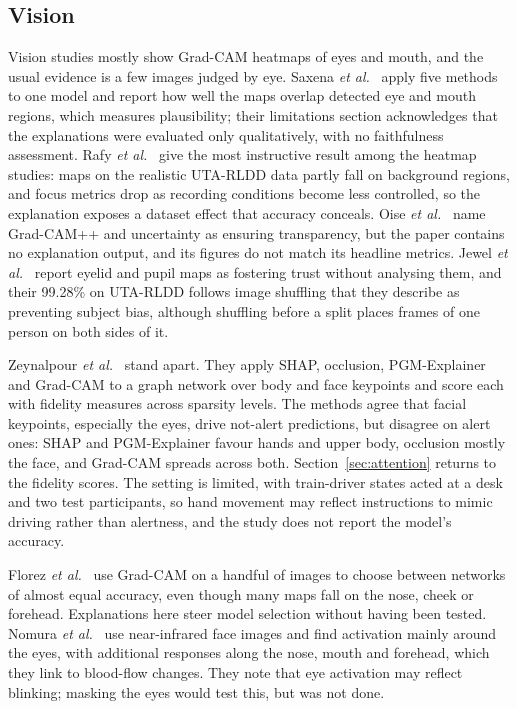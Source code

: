 \subsection{Vision}
\label{sec:vision}
Vision studies mostly show Grad-CAM heatmaps of eyes and mouth, and the usual evidence is a few images judged by eye. Saxena \textit{et al.}~\cite{saxena2026lowlight} apply five methods to one model and report how well the maps overlap detected eye and mouth regions, which measures plausibility; their limitations section acknowledges that the explanations were evaluated only qualitatively, with no faithfulness assessment. Rafy \textit{et al.}~\cite{rafy2026domain} give the most instructive result among the heatmap studies: maps on the realistic UTA-RLDD data partly fall on background regions, and focus metrics drop as recording conditions become less controlled, so the explanation exposes a dataset effect that accuracy conceals. Oise \textit{et al.}~\cite{oise2026enhancing} name Grad-CAM++ and uncertainty as ensuring transparency, but the paper contains no explanation output, and its figures do not match its headline metrics. Jewel \textit{et al.}~\cite{jewel2025lightweight} report eyelid and pupil maps as fostering trust without analysing them, and their 99.28\% on UTA-RLDD follows image shuffling that they describe as preventing subject bias, although shuffling before a split places frames of one person on both sides of it.

Zeynalpour \textit{et al.}~\cite{zeynalpour2025multimethod} stand apart. They apply SHAP, occlusion, PGM-Explainer and Grad-CAM to a graph network over body and face keypoints and score each with fidelity measures across sparsity levels. The methods agree that facial keypoints, especially the eyes, drive not-alert predictions, but disagree on alert ones: SHAP and PGM-Explainer favour hands and upper body, occlusion mostly the face, and Grad-CAM spreads across both. Section~\ref{sec:attention} returns to the fidelity scores. The setting is limited, with train-driver states acted at a desk and two test participants, so hand movement may reflect instructions to mimic driving rather than alertness, and the study does not report the model's accuracy.

Florez \textit{et al.}~\cite{florez2023cnn,florez2024realtime} use Grad-CAM on a handful of images to choose between networks of almost equal accuracy, even though many maps fall on the nose, cheek or forehead. Explanations here steer model selection without having been tested. Nomura \textit{et al.}~\cite{nomura2025drowsiness} use near-infrared face images and find activation mainly around the eyes, with additional responses along the nose, mouth and forehead, which they link to blood-flow changes. They note that eye activation may reflect blinking; masking the eyes would test this, but was not done.

